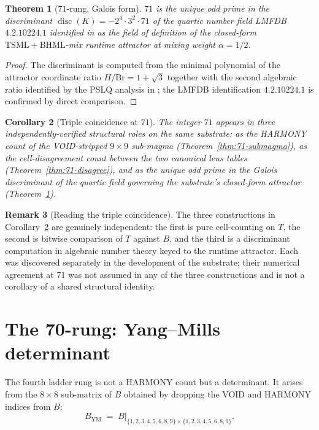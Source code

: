 \documentclass[11pt,reqno]{amsart}
\newtheorem{theorem}{Theorem}[section]
\newtheorem{corollary}[theorem]{Corollary}
\theoremstyle{definition}
\newtheorem{remark}[theorem]{Remark}
\newcommand{\TSML}{\mathrm{TSML}}
\newcommand{\BHML}{\mathrm{BHML}}
\DeclareMathOperator{\disc}{disc}
\begin{document}
\begin{theorem}[$71$-rung, Galois form]
\label{thm:71-galois}
$71$ is the unique odd prime in the discriminant
$\disc(K) = -2^{4} \cdot 3^{2} \cdot 71$ of the quartic number field
LMFDB $4.2.10224.1$ identified in \cite{Sanders2026Attractor} as the
field of definition of the closed-form $\TSML+\BHML$-mix runtime
attractor at mixing weight $\alpha = 1/2$.
\end{theorem}

\begin{proof}
The discriminant is computed from the minimal polynomial of the
attractor coordinate ratio $H/\mathrm{Br} = 1 + \sqrt{3}$ together
with the second algebraic ratio identified by the PSLQ analysis in
\cite{Sanders2026Attractor}; the LMFDB identification $4.2.10224.1$
is confirmed by direct comparison.
\end{proof}

\begin{corollary}[Triple coincidence at $71$]
\label{cor:71-triple}
The integer $71$ appears in three independently-verified structural
roles on the same substrate: as the HARMONY count of the VOID-stripped
$9 \times 9$ sub-magma (Theorem~\ref{thm:71-submagma}), as the
cell-disagreement count between the two canonical lens tables
(Theorem~\ref{thm:71-disagree}), and as the unique odd prime in the
Galois discriminant of the quartic field governing the substrate's
closed-form attractor (Theorem~\ref{thm:71-galois}).
\end{corollary}

\begin{remark}[Reading the triple coincidence]
\label{rem:71-reading}
The three constructions in Corollary~\ref{cor:71-triple} are
genuinely independent: the first is pure cell-counting on $T$, the
second is bitwise comparison of $T$ against $B$, and the third is a
discriminant computation in algebraic number theory keyed to the
runtime attractor. Each was discovered separately in the development
of the substrate; their numerical agreement at $71$ was not assumed
in any of the three constructions and is not a corollary of a
shared structural identity.
\end{remark}

\section{The 70-rung: Yang--Mills determinant}
\label{sec:70}

The fourth ladder rung is not a HARMONY count but a determinant. It
arises from the $8 \times 8$ sub-matrix of $B$ obtained by dropping
the VOID and HARMONY indices from $B$:
\[
  B_{\mathrm{YM}} \;=\; B|_{\{1,2,3,4,5,6,8,9\} \times \{1,2,3,4,5,6,8,9\}}.
\]
\end{document}
